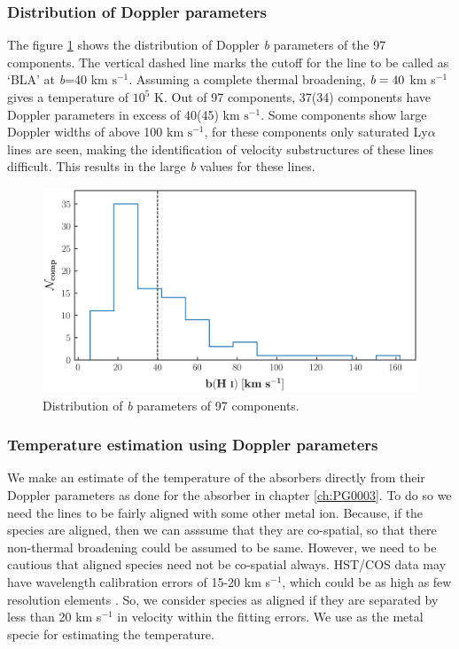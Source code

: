 \subsubsection*{Distribution of Doppler parameters}

The figure \ref{fig:b_HI_distribution} shows the distribution of Doppler \emph{b} parameters of the 97  components. The vertical dashed line marks the cutoff for the line to be called as `BLA' at \emph{b}=40 km $\text{s}^{-1}$. Assuming a complete thermal broadening, $\emph{b}=40$ km s$^{-1}$ gives a temperature of $10^5$ K. Out of 97 components, 37(34) components have Doppler parameters in excess of 40(45) km $\text{s}^{-1}$. Some components show large Doppler widths of above 100 km $\text{s}^{-1}$, for these components only saturated Ly$\alpha$ lines are seen, making the identification of velocity substructures of these lines difficult. This results in the large \emph{b} values for these lines. 

\begin{figure}
    \centering
    \includegraphics[width=\linewidth]{Figures/b_HI_distribution_survey.png}
    \caption{Distribution of \emph{b} parameters of 97  components.}
    \label{fig:b_HI_distribution} 
\end{figure}

\subsubsection*{Temperature estimation using Doppler parameters}  \label{sec:Temp}

We make an estimate of the temperature of the absorbers directly from their Doppler parameters as done for the absorber in chapter \ref{ch:PG0003}. To do so we need the  lines to be fairly aligned with some other metal ion. Because, if the species are aligned, then we can asssume that they are co-spatial, so that there non-thermal broadening could be assumed to be same. However, we need to be cautious that aligned species need not be co-spatial always. HST/COS data may have wavelength calibration errors of 15-20 km s$^{-1}$, which could be as high as few resolution elements \citep{Wakker-2015}. So, we consider species as aligned if they are separated by less than 20 km s$^{-1}$ in velocity within the fitting errors. We use  as the metal specie for estimating the temperature.


